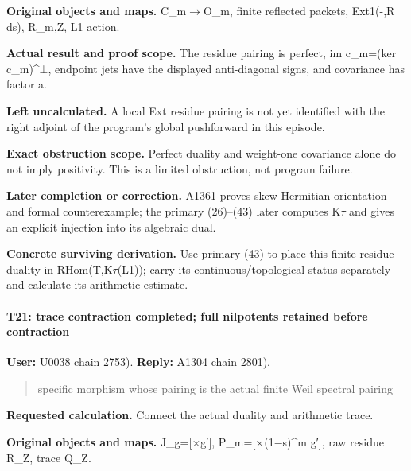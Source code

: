 \textbf{Original objects and maps.}
C\_m\allowbreak{}\ensuremath{→}\allowbreak{}O\_m, finite reflected
packets, Ext1(-,R ds), R\_m,Z, L1 action.

\textbf{Actual result and proof scope.} The residue pairing is perfect,
im c\_m=(ker
c\_m)\textasciicircum{}\allowbreak{}\ensuremath{⊥}\allowbreak{},
endpoint jets have the displayed anti-diagonal signs, and covariance has
factor a.

\textbf{Left uncalculated.} A local Ext residue pairing is not yet
identified with the right adjoint of the program's global pushforward in
this episode.

\textbf{Exact obstruction scope.} Perfect duality and weight-one
covariance alone do not imply positivity. This is a limited obstruction,
not program failure.

\textbf{Later completion or correction.} A1361 proves skew-Hermitian
orientation and formal counterexample; the primary (26)--(43) later
computes K\allowbreak{}\ensuremath{τ}\allowbreak{} and gives an explicit
injection into its algebraic dual.

\textbf{Concrete surviving derivation.} Use primary (43) to place this
finite residue duality in
RHom(T,K\allowbreak{}\ensuremath{τ}\allowbreak{}(L1)); carry its
continuous/topological status separately and calculate its arithmetic
estimate.

\paragraph{T21: trace contraction completed; full nilpotents retained
before
contraction}\label{t21-trace-contraction-completed-full-nilpotents-retained-before-contraction}

\textbf{User:} U0038
\protect{} chain 2753).
\textbf{Reply:} A1304
\protect{} chain 2801).

\begin{quote}
specific morphism whose pairing is the actual finite Weil spectral
pairing
\end{quote}

\textbf{Requested calculation.} Connect the actual duality and
arithmetic trace.

\textbf{Original objects and maps.}
J\_g=[\allowbreak{}\ensuremath{×}\allowbreak{}g′],
P\_m=[\allowbreak{}\ensuremath{×}\allowbreak{}(1\allowbreak{}\ensuremath{−}\allowbreak{}s)\textasciicircum{}m
g′{]}, raw residue R\_Z, trace Q\_Z.

